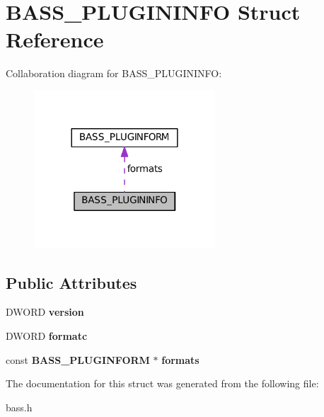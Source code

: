\section{B\+A\+S\+S\+\_\+\+P\+L\+U\+G\+I\+N\+I\+N\+F\+O Struct Reference}
\label{struct_b_a_s_s___p_l_u_g_i_n_i_n_f_o}


Collaboration diagram for B\+A\+S\+S\+\_\+\+P\+L\+U\+G\+I\+N\+I\+N\+F\+O\+:
\nopagebreak
\begin{figure}[H]
\begin{center}
\leavevmode
\includegraphics[width=192pt]{struct_b_a_s_s___p_l_u_g_i_n_i_n_f_o__coll__graph}
\end{center}
\end{figure}
\subsection*{Public Attributes}
\begin{DoxyCompactItemize}
\item 
D\+W\+O\+R\+D {\bfseries version}\label{struct_b_a_s_s___p_l_u_g_i_n_i_n_f_o_a893c8f212060896e986b82487c9710a2}

\item 
D\+W\+O\+R\+D {\bfseries formatc}\label{struct_b_a_s_s___p_l_u_g_i_n_i_n_f_o_a45daf6218ce12dd4e8fc01316b9852e9}

\item 
const {\bf B\+A\+S\+S\+\_\+\+P\+L\+U\+G\+I\+N\+F\+O\+R\+M} $\ast$ {\bfseries formats}\label{struct_b_a_s_s___p_l_u_g_i_n_i_n_f_o_a887355ebae589a33b61d5736699f12c2}

\end{DoxyCompactItemize}


The documentation for this struct was generated from the following file\+:\begin{DoxyCompactItemize}
\item 
bass.\+h\end{DoxyCompactItemize}
